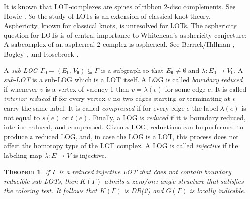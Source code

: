 \documentclass[12pt]{amsart}
\newtheorem{thm}{Theorem}[section]
\theoremstyle{definition}
\begin{document}
It is known that LOT-complexes are spines of ribbon 2-disc complements. See Howie \cite{How83}. So the study of LOTs is an extension of classical knot theory. Asphericity, known for classical knots, is unresolved for LOTs. The asphericity question for LOTs is of central importance to Whitehead's asphericity conjecture: A subcomplex of an aspherical 2-complex is aspherical. See Berrick/Hillman \cite{BerrickHillman}, Bogley \cite{Bogley}, and Rosebrock \cite{Ro18}.

A {\em sub-LOG} $\Gamma_0=(E_0, V_0)\subseteq\Gamma$ is a subgraph so that $E_0\ne\emptyset$ and $\lambda\colon E_0\to V_0$. A {\em sub-LOT} is a sub-LOG which is a LOT itself. A LOG is called {\em boundary reduced} if whenever $v$ is a vertex of valency 1 then $v=\lambda(e)$ for some edge $e$. It is called {\em interior reduced} if for every vertex $v$ no two edges starting or terminating at $v$ carry the same label. It is called {\em compressed }if for every edge $e$ the label $\lambda(e)$ is not equal to $s(e)$ or $t(e)$. Finally, a LOG is {\em reduced} if it is boundary reduced, interior reduced, and compressed. Given a LOG, reductions can be performed to produce a reduced LOG, and, in case the LOG is a LOT, this process does not affect the homotopy type of the LOT complex. A LOG is called {\em injective} if the labeling map $\lambda\colon E\to V$ is injective. \\


\begin{thm}\label{thm:HuckRose} If $\Gamma$ is a reduced injective LOT that does not contain boundary reducible sub-LOTs, then $K(\Gamma)$ admits a zero/one-angle structure that satisfies the coloring test. It follows that $K(\Gamma)$ is DR(2) and $G(\Gamma)$ is locally indicable.
\end{thm}
\end{document}
